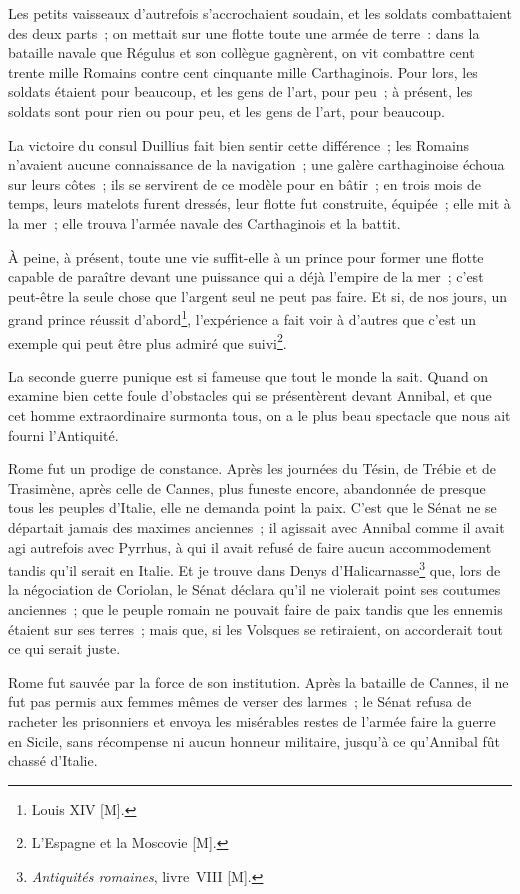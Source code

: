 \documentclass[french,twoside]{book} %
\begin{document}
Les petits vaisseaux d’autrefois s’accrochaient soudain, et les soldats combattaient des deux parts ; on mettait sur une flotte toute une armée de terre : dans la bataille navale que Régulus et son collègue gagnèrent, on vit combattre cent trente mille Romains contre cent cinquante mille Carthaginois. Pour lors, les soldats étaient pour beaucoup, et les gens de l’art, pour peu ; à présent, les soldats sont pour rien ou pour peu, et les gens de l’art, pour beaucoup.\par
La victoire du consul Duillius fait bien sentir cette différence ; les Romains n’avaient aucune connaissance de la navigation ; une galère carthaginoise échoua sur leurs côtes ; ils se servirent de ce modèle pour en bâtir ; en trois mois de temps, leurs matelots furent dressés, leur flotte fut construite, équipée ; elle mit à la mer ; elle trouva l’armée navale des Carthaginois et la battit.\par
À peine, à présent, toute une vie suffit-elle à un prince pour former une flotte capable de paraître devant une puissance qui a déjà l’empire de la mer ; c’est peut-être la seule chose que l’argent seul ne peut pas faire. Et si, de nos jours, un grand prince réussit d’abord\footnote{Louis XIV [M].}, l’expérience a fait voir à d’autres que c’est un exemple qui peut être plus admiré que suivi\footnote{L’Espagne et la Moscovie [M].}.\par
La seconde guerre punique est si fameuse que tout le monde la sait. Quand on examine bien cette foule d’obstacles qui se présentèrent devant Annibal, et que cet homme extraordinaire surmonta tous, on a le plus beau spectacle que nous ait fourni l’Antiquité.\par
Rome fut un prodige de constance. Après les journées du Tésin, de Trébie et de Trasimène, après celle de Cannes, plus funeste encore, abandonnée de presque tous les peuples d’Italie, elle ne demanda point la paix. C’est que le Sénat ne se départait jamais des maximes anciennes ; il agissait avec Annibal comme il avait agi autrefois avec Pyrrhus, à qui il avait refusé de faire aucun accommodement tandis qu’il serait en Italie. Et je trouve dans Denys d’Halicarnasse\footnote{{\itshape Antiquités romaines}, livre VIII [M].} que, lors de la négociation de Coriolan, le Sénat déclara qu’il ne violerait point ses coutumes anciennes ; que le peuple romain ne pouvait faire de paix tandis que les ennemis étaient sur ses terres ; mais que, si les Volsques se retiraient, on accorderait tout ce qui serait juste.\par
Rome fut sauvée par la force de son institution. Après la bataille de Cannes, il ne fut pas permis aux femmes mêmes de verser des larmes ; le Sénat refusa de racheter les prisonniers et envoya les misérables restes de l’armée faire la guerre en Sicile, sans récompense ni aucun honneur militaire, jusqu’à ce qu’Annibal fût chassé d’Italie.\par
\end{document}
